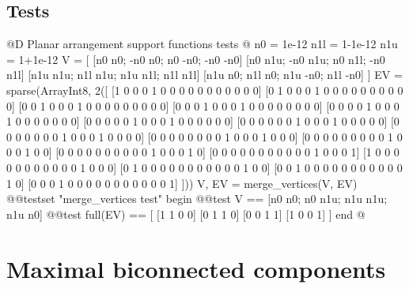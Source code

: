 \documentclass[10pt]{book}
\begin{document}
\subsection{Tests}
@D Planar arrangement support functions tests
@{
n0 = 1e-12
n1l = 1-1e-12
n1u = 1+1e-12
V = [
    [n0 n0; -n0 n0; n0 -n0; -n0 -n0]
    [n0 n1u; -n0 n1u; n0 n1l; -n0 n1l]
    [n1u n1u; n1l n1u; n1u n1l; n1l n1l]
    [n1u n0; n1l n0; n1u -n0; n1l -n0]
]
EV = sparse(Array{Int8, 2}([
    [1 0 0 0 1 0 0 0 0 0 0 0 0 0 0 0]
    [0 1 0 0 0 1 0 0 0 0 0 0 0 0 0 0]
    [0 0 1 0 0 0 1 0 0 0 0 0 0 0 0 0]
    [0 0 0 1 0 0 0 1 0 0 0 0 0 0 0 0]
    [0 0 0 0 1 0 0 0 1 0 0 0 0 0 0 0]
    [0 0 0 0 0 1 0 0 0 1 0 0 0 0 0 0]
    [0 0 0 0 0 0 1 0 0 0 1 0 0 0 0 0]
    [0 0 0 0 0 0 0 1 0 0 0 1 0 0 0 0]
    [0 0 0 0 0 0 0 0 1 0 0 0 1 0 0 0]
    [0 0 0 0 0 0 0 0 0 1 0 0 0 1 0 0]
    [0 0 0 0 0 0 0 0 0 0 1 0 0 0 1 0]
    [0 0 0 0 0 0 0 0 0 0 0 1 0 0 0 1]
    [1 0 0 0 0 0 0 0 0 0 0 0 1 0 0 0]
    [0 1 0 0 0 0 0 0 0 0 0 0 0 1 0 0]
    [0 0 1 0 0 0 0 0 0 0 0 0 0 0 1 0]
    [0 0 0 1 0 0 0 0 0 0 0 0 0 0 0 1]
]))
V, EV = merge_vertices(V, EV)
@@testset "merge_vertices test" begin
    @@test V == [n0 n0; n0 n1u; n1u n1u; n1u n0]
    @@test full(EV) == [
        [1 1 0 0]
        [0 1 1 0]
        [0 0 1 1]
        [1 0 0 1]
    ]
end
@}




\section{Maximal biconnected components}
\end{document}
